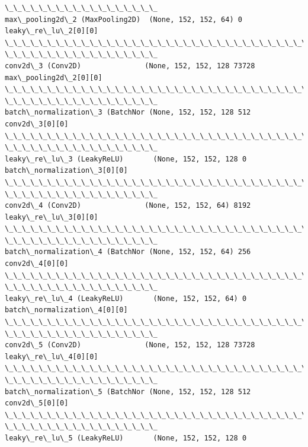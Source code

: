 \documentclass[11pt]{article}
\begin{document}
\begin{Verbatim}[commandchars=\\\{\}]
\_\_\_\_\_\_\_\_\_\_\_\_\_\_\_\_\_\_
max\_pooling2d\_2 (MaxPooling2D)  (None, 152, 152, 64) 0
leaky\_re\_lu\_2[0][0]
\_\_\_\_\_\_\_\_\_\_\_\_\_\_\_\_\_\_\_\_\_\_\_\_\_\_\_\_\_\_\_\_\_\_\_\_\_\_\_\_\_\_\_\_\_\_\_\_\_\_\_\_\_\_\_\_\_\_\_\_\_\_\_\_\_\_\_\_\_\_\_\_\_\_\_\_\_\_\_\_
\_\_\_\_\_\_\_\_\_\_\_\_\_\_\_\_\_\_
conv2d\_3 (Conv2D)               (None, 152, 152, 128 73728
max\_pooling2d\_2[0][0]
\_\_\_\_\_\_\_\_\_\_\_\_\_\_\_\_\_\_\_\_\_\_\_\_\_\_\_\_\_\_\_\_\_\_\_\_\_\_\_\_\_\_\_\_\_\_\_\_\_\_\_\_\_\_\_\_\_\_\_\_\_\_\_\_\_\_\_\_\_\_\_\_\_\_\_\_\_\_\_\_
\_\_\_\_\_\_\_\_\_\_\_\_\_\_\_\_\_\_
batch\_normalization\_3 (BatchNor (None, 152, 152, 128 512         conv2d\_3[0][0]
\_\_\_\_\_\_\_\_\_\_\_\_\_\_\_\_\_\_\_\_\_\_\_\_\_\_\_\_\_\_\_\_\_\_\_\_\_\_\_\_\_\_\_\_\_\_\_\_\_\_\_\_\_\_\_\_\_\_\_\_\_\_\_\_\_\_\_\_\_\_\_\_\_\_\_\_\_\_\_\_
\_\_\_\_\_\_\_\_\_\_\_\_\_\_\_\_\_\_
leaky\_re\_lu\_3 (LeakyReLU)       (None, 152, 152, 128 0
batch\_normalization\_3[0][0]
\_\_\_\_\_\_\_\_\_\_\_\_\_\_\_\_\_\_\_\_\_\_\_\_\_\_\_\_\_\_\_\_\_\_\_\_\_\_\_\_\_\_\_\_\_\_\_\_\_\_\_\_\_\_\_\_\_\_\_\_\_\_\_\_\_\_\_\_\_\_\_\_\_\_\_\_\_\_\_\_
\_\_\_\_\_\_\_\_\_\_\_\_\_\_\_\_\_\_
conv2d\_4 (Conv2D)               (None, 152, 152, 64) 8192
leaky\_re\_lu\_3[0][0]
\_\_\_\_\_\_\_\_\_\_\_\_\_\_\_\_\_\_\_\_\_\_\_\_\_\_\_\_\_\_\_\_\_\_\_\_\_\_\_\_\_\_\_\_\_\_\_\_\_\_\_\_\_\_\_\_\_\_\_\_\_\_\_\_\_\_\_\_\_\_\_\_\_\_\_\_\_\_\_\_
\_\_\_\_\_\_\_\_\_\_\_\_\_\_\_\_\_\_
batch\_normalization\_4 (BatchNor (None, 152, 152, 64) 256         conv2d\_4[0][0]
\_\_\_\_\_\_\_\_\_\_\_\_\_\_\_\_\_\_\_\_\_\_\_\_\_\_\_\_\_\_\_\_\_\_\_\_\_\_\_\_\_\_\_\_\_\_\_\_\_\_\_\_\_\_\_\_\_\_\_\_\_\_\_\_\_\_\_\_\_\_\_\_\_\_\_\_\_\_\_\_
\_\_\_\_\_\_\_\_\_\_\_\_\_\_\_\_\_\_
leaky\_re\_lu\_4 (LeakyReLU)       (None, 152, 152, 64) 0
batch\_normalization\_4[0][0]
\_\_\_\_\_\_\_\_\_\_\_\_\_\_\_\_\_\_\_\_\_\_\_\_\_\_\_\_\_\_\_\_\_\_\_\_\_\_\_\_\_\_\_\_\_\_\_\_\_\_\_\_\_\_\_\_\_\_\_\_\_\_\_\_\_\_\_\_\_\_\_\_\_\_\_\_\_\_\_\_
\_\_\_\_\_\_\_\_\_\_\_\_\_\_\_\_\_\_
conv2d\_5 (Conv2D)               (None, 152, 152, 128 73728
leaky\_re\_lu\_4[0][0]
\_\_\_\_\_\_\_\_\_\_\_\_\_\_\_\_\_\_\_\_\_\_\_\_\_\_\_\_\_\_\_\_\_\_\_\_\_\_\_\_\_\_\_\_\_\_\_\_\_\_\_\_\_\_\_\_\_\_\_\_\_\_\_\_\_\_\_\_\_\_\_\_\_\_\_\_\_\_\_\_
\_\_\_\_\_\_\_\_\_\_\_\_\_\_\_\_\_\_
batch\_normalization\_5 (BatchNor (None, 152, 152, 128 512         conv2d\_5[0][0]
\_\_\_\_\_\_\_\_\_\_\_\_\_\_\_\_\_\_\_\_\_\_\_\_\_\_\_\_\_\_\_\_\_\_\_\_\_\_\_\_\_\_\_\_\_\_\_\_\_\_\_\_\_\_\_\_\_\_\_\_\_\_\_\_\_\_\_\_\_\_\_\_\_\_\_\_\_\_\_\_
\_\_\_\_\_\_\_\_\_\_\_\_\_\_\_\_\_\_
leaky\_re\_lu\_5 (LeakyReLU)       (None, 152, 152, 128 0

\end{Verbatim}
\end{document}
